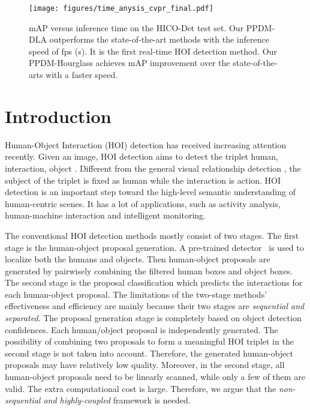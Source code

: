 \documentclass[10pt,twocolumn,letterpaper]{article}
\begin{document}
\begin{figure}[h]
  \centering
  \texttt{[image: figures/time\_anysis\_cvpr\_final.pdf]}
  \vspace{-2mm}
  \caption{mAP versus inference time on the HICO-Det test set. Our PPDM-DLA outperforms the state-of-the-art methods with the inference speed of  fps (s). It is the first real-time HOI detection method. Our PPDM-Hourglass achieves  mAP improvement over the state-of-the-arts with a faster speed.}
  \label{fig:first}
   \vspace{-3.5mm}
\end{figure}
\section{Introduction}
Human-Object Interaction (HOI) detection \cite{yao2012recognizing,gupta2015visual,gupta2009observing,gkioxari2018detecting,gupta2018no,li2018transferable,qi2018learning} has received increasing attention recently. Given an image, HOI detection aims to detect the triplet  human, interaction, object . Different from the general visual relationship detection \cite{lu2016visual,xu2017scene,newell2017pixels,herzig2018mapping,zhang2019graphical}, the subject of the triplet is fixed as human while the interaction is action.  HOI detection is an important step toward the high-level semantic understanding of human-centric scenes. It has a lot of applications, such as activity analysis, human-machine interaction and intelligent monitoring.


The conventional HOI detection methods \cite{chao2018learning,qi2018learning,gupta2018no,li2018transferable,Wan_2019_ICCV}  mostly consist of two stages. The first stage is the human-object proposal generation. A pre-trained detector~\cite{girshick2015fast,ren2015faster} is used to localize both the humans and objects. Then  human-object proposals are generated by pairwisely combining the filtered   human boxes and  object boxes. The second stage is the proposal classification which predicts the interactions for each human-object proposal.
The limitations of the two-stage methods' effectiveness and efficiency are mainly because their two stages are \emph{sequential and separated}.  The proposal generation stage is completely based on object detection confidences. Each human/object proposal is independently generated. The possibility of combining two proposals to form a meaningful HOI triplet in the second stage is not taken into account. Therefore, the generated human-object proposals may have relatively low quality.  Moreover, in the second stage, all human-object proposals need to be linearly scanned, while only a few of them are valid. The extra computational cost is large. Therefore, we argue that the \emph{non-sequential and highly-coupled} framework is needed.
\end{document}
